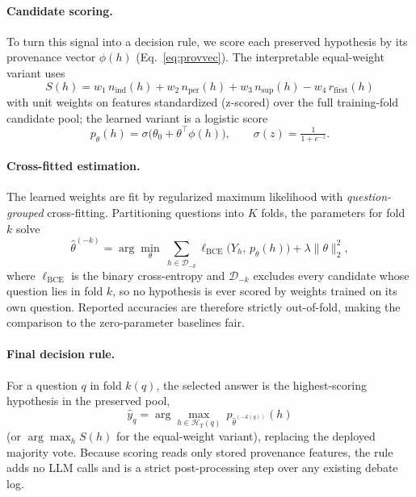 \paragraph{Candidate scoring.}
\label{par:candidate_scoring}
To turn this signal into a decision rule, we score each preserved hypothesis by its provenance vector
$\phi(h)$ (Eq.~\ref{eq:provvec}). The interpretable equal-weight variant uses
\begin{equation}
S(h)=w_1\,n_{\mathrm{ind}}(h)+w_2\,n_{\mathrm{per}}(h)+w_3\,n_{\mathrm{sup}}(h)-w_4\,r_{\mathrm{first}}(h)
\label{eq:sel_linear}
\end{equation}
with unit weights on features standardized (z-scored) over the full training-fold candidate pool; the learned variant is a logistic score
\begin{equation}
p_\theta(h)=\sigma\!\big(\theta_0+\theta^\top\phi(h)\big),\qquad \sigma(z)=\tfrac{1}{1+e^{-z}} .
\label{eq:sel_prob}
\end{equation}

\paragraph{Cross-fitted estimation.}
\label{par:crossfit}
The learned weights are fit by regularized maximum likelihood with \emph{question-grouped} cross-fitting.
Partitioning questions into $K$ folds, the parameters for fold $k$ solve
\begin{equation}
\hat\theta^{(-k)}=\arg\min_{\theta}\ \sum_{h\in\mathcal{D}_{-k}}\ell_{\mathrm{BCE}}\!\big(Y_h,\,p_\theta(h)\big)+\lambda\lVert\theta\rVert_2^2 ,
\label{eq:sel_fit}
\end{equation}
where $\ell_{\mathrm{BCE}}$ is the binary cross-entropy and $\mathcal{D}_{-k}$ excludes every candidate whose
question lies in fold $k$, so no hypothesis is ever scored by weights trained on its own question. Reported
accuracies are therefore strictly out-of-fold, making the comparison to the zero-parameter baselines fair.

\paragraph{Final decision rule.}
\label{par:decision_rule}
For a question $q$ in fold $k(q)$, the selected answer is the highest-scoring hypothesis in the preserved pool,
\begin{equation}
\boxed{\ \hat{y}_q=\arg\max_{h\in\mathcal{H}_T(q)}\ p_{\hat\theta^{(-k(q))}}(h)\ }
\label{eq:sel_decision}
\end{equation}
(or $\arg\max_h S(h)$ for the equal-weight variant), replacing the deployed majority vote. Because scoring
reads only stored provenance features, the rule adds no LLM calls and is a strict post-processing step over
any existing debate log.

